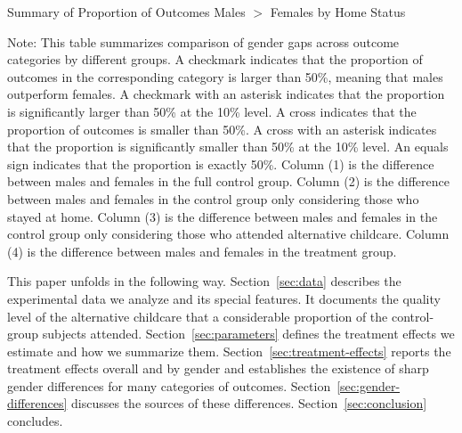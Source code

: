 \begin{table}[H]
\centering
\caption{Summary of Proportion of Outcomes Males $>$ Females by Home Status}
\label{tab:proportion-table}
\begin{threeparttable}
\begin{footnotesize}

\end{footnotesize}
\begin{tablenotes}
\footnotesize
\item Note: This table summarizes comparison of gender gaps across outcome categories by different groups. A checkmark indicates that the proportion of outcomes in the corresponding category is larger than 50\%, meaning that males outperform females. A checkmark with an asterisk indicates that the proportion is significantly larger than 50\% at the 10\% level. A cross indicates that the proportion of outcomes is smaller than 50\%. A cross with an asterisk indicates that the proportion is significantly smaller than 50\% at the 10\% level. An equals sign indicates that the proportion is exactly 50\%. Column (1) is the difference between males and females in the full control group.  Column (2) is the difference between males and females in the control group only considering those who stayed at home. Column (3) is the difference between males and females in the control group only considering those who attended alternative childcare. Column (4) is the difference between males and females in the treatment group.
\end{tablenotes}
\end{threeparttable}
\end{table}

This paper unfolds in the following way. Section~\ref{sec:data} describes the experimental data we analyze and its special features. It documents the quality level of the alternative childcare that a considerable proportion of the control-group subjects attended. Section~\ref{sec:parameters} defines the treatment effects we estimate and how we summarize them. Section~\ref{sec:treatment-effects} reports the treatment effects overall and by gender and establishes the existence of sharp gender differences for many categories of outcomes. Section~\ref{sec:gender-differences} discusses the sources of these differences. Section~\ref{sec:conclusion} concludes.


